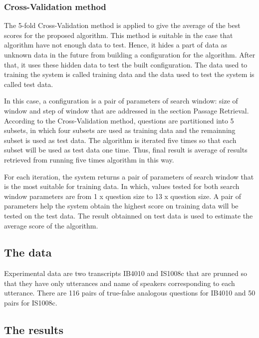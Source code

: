 \documentclass[10pt,a4paper]{article}
\numberwithin{algorithm}{section}  %
\begin{document}
\subsubsection*{Cross-Validation method}
 
 The 5-fold Cross-Validation method \cite{kohavi1995scv} is applied to give the average of the best scores for the proposed algorithm. This method is suitable in the case that algorithm have not enough data to test. Hence, it hides a part of data as unknown data in the future from building a configuration for the algorithm. After that, it uses these hidden data to test the built configuration. The data used to training the system is called training data and the data used to test the system is called test data.
 
In this case, a configuration is a pair of parameters of search window: size of window and step of window that are addressed in the section Passage Retrieval. According to the Cross-Validation method, questions are partitioned into 5 subsets, in which four subsets are used as training data and the remainning subset is used as test data. The algorithm is iterated five times so that each subset will be used as test data one time. Thus, final result is average of results retrieved from running five times algorithm in this way.

For each iteration, the system returns a pair of parameters of search window that is the most suitable for training data. In which, values tested for both search window parameters are  from 1 x question size to 13 x question size. A pair of parameters help the system obtain the highest score on training data will be tested on the test data. The result obtainned on test data is used to estimate the average score of the algorithm.

\subsection{The data}
Experimental data are two transcripts IB4010 and IS1008c that are prunned so that they have only utterances and name of speakers corresponding to each utterance. There are 116 pairs of true-false analogous questions for IB4010 and 50 pairs for IS1008c.

\subsection{The results}
\end{document}
